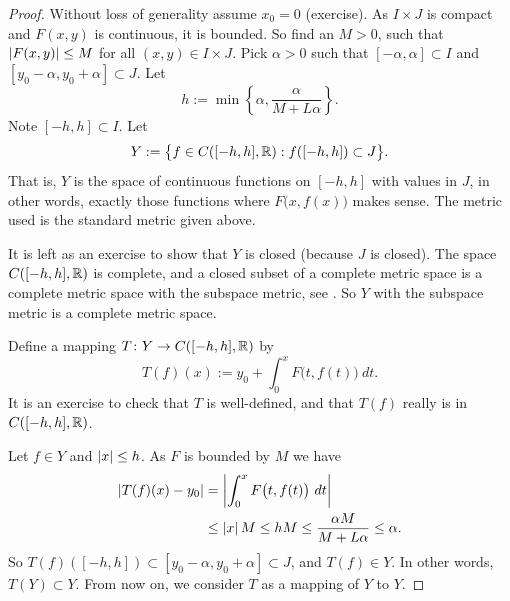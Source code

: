 \begin{proof}
Without loss of generality assume $x_0 =0$ (exercise).
As $I \times J$ is compact and
$F(x,y)$ is continuous, it is bounded.
So find an $M > 0$, such that
$\left\lvert {F(x,y)} \right\rvert \leq M$ for all $(x,y) \in I\times J$.
Pick $\alpha > 0$ such that
$[-\alpha,\alpha] \subset I$ and $[y_0-\alpha, y_0 + \alpha] \subset J$.
Let
\begin{equation*}
h := \min \left\{ \alpha, \frac{\alpha}{M+L\alpha} \right\} .
\end{equation*}
Note $[-h,h] \subset I$.  Let
\begin{equation*}
Y := \bigl\{ f \in C([-h,h],{\mathbb{R}}) : f([-h,h]) \subset J \bigr\} .
\end{equation*}
That is, $Y$ is the space of continuous functions on $[-h,h]$ with values in
$J$, in other words,
exactly those functions where $F\bigl(x,f(x)\bigr)$ makes sense.
The metric used is the standard metric given above.

It is left as an exercise to show that $Y$ is closed (because $J$ is closed).
The space $C([-h,h],{\mathbb{R}})$ is complete, and
a closed subset of a complete metric space is a complete metric space with
the subspace metric, see .  So $Y$ with the
subspace metric is a complete metric space.

Define a mapping
$T \colon Y \to C([-h,h],{\mathbb{R}})$ by
\begin{equation*}
T(f)(x)
:=
y_0 + \int_0^x F\bigl(t,f(t)\bigr)~dt .
\end{equation*}
It is an exercise to check that
$T$ is well-defined, and that $T(f)$ really is in $C([-h,h],{\mathbb{R}})$.

Let $f \in Y$ and $\left\lvert {x} \right\rvert \leq h$.
As $F$ is bounded by $M$ we have
\begin{equation*}
\begin{split}
\left\lvert {T(f)(x) - y_0} \right\rvert
&= \left\lvert {\int_0^x F\bigl(t,f(t)\bigr)~dt} \right\rvert \\
& \leq 
\left\lvert {x} \right\rvert M \leq hM \leq \frac{\alpha M}{M+ L\alpha} \leq \alpha .
\end{split}
\end{equation*}
So $T(f)([-h,h]) \subset [y_0-\alpha,y_0+\alpha] \subset J$, and
$T(f) \in Y$.  In other words, $T(Y) \subset Y$.  From now on,
we consider $T$ as a mapping of $Y$ to $Y$.


\end{proof}
